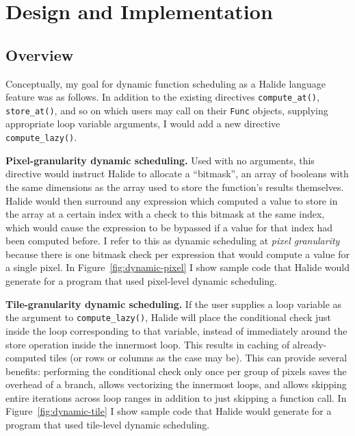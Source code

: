 \documentclass{article}
\begin{document}
\section{Design and Implementation}


\subsection{Overview}

Conceptually, my goal for dynamic function scheduling as a Halide language feature was as follows. In addition to the existing directives \texttt{compute\_at()}, \texttt{store\_at()}, and so on which users may call on their \texttt{Func} objects, supplying appropriate loop variable arguments, I would add a new directive \texttt{compute\_lazy()}.

{\bf Pixel-granularity dynamic scheduling.} Used with no arguments, this directive would instruct Halide to allocate a ``bitmask'', an array of booleans with the same dimensions as the array used to store the function's results themselves. Halide would then surround any expression which computed a value to store in the array at a certain index with a check to this bitmask at the same index, which would cause the expression to be bypassed if a value for that index had been computed before. I refer to this as dynamic scheduling at {\em pixel granularity} because there is one bitmask check per expression that would compute a value for a single pixel. In Figure~\ref{fig:dynamic-pixel} I show sample code that Halide would generate for a program that used pixel-level dynamic scheduling.

{\bf Tile-granularity dynamic scheduling.} If the user supplies a loop variable as the argument to \texttt{compute\_lazy()}, Halide will place the conditional check just inside the loop corresponding to that variable, instead of immediately around the store operation inside the innermost loop. This results in caching of already-computed tiles (or rows or columns as the case may be). This can provide several benefits: performing the conditional check only once per group of pixels saves the overhead of a branch, allows vectorizing the innermost loops, and allows skipping entire iterations across loop ranges in addition to just skipping a function call. In Figure~\ref{fig:dynamic-tile} I show sample code that Halide would generate for a program that used tile-level dynamic scheduling.
\end{document}
